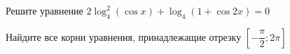\begin{ex}
	\begin{condition}
		\begin{enumcols}[label=\asbuk*)]
			\item Решите уравнение \( 2\log_4^2 (\cos x )+\log_4 (1  + \cos 2x)  = 0 \)
			\item Найдите все корни уравнения, принадлежащие отрезку \( \left[-\dfrac{\pi}{2};2\pi\right] \)
		\end{enumcols}
	\end{condition}
\end{ex}